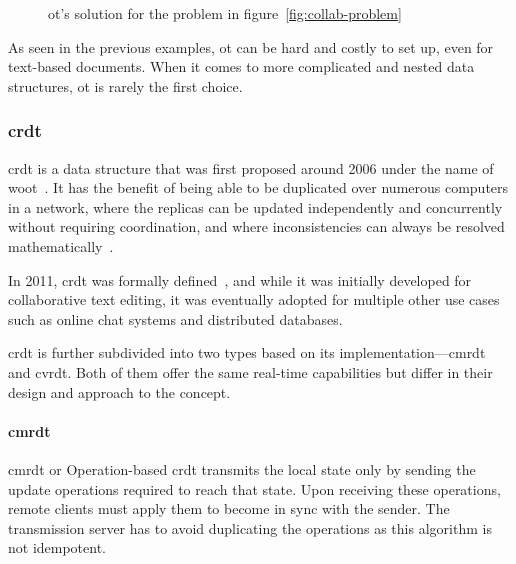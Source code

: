 \begin{toexclude}
\begin{figure}[H]

	\caption{\acrshort{ot}'s solution for the problem in figure~\ref{fig:collab-problem}}
	\label{fig:collab-sol-ot}
\end{figure}

As seen in the previous examples, \acrshort{ot} can be hard and costly to set up, even for text-based documents.
When it comes to more complicated and nested data structures, \acrshort{ot} is rarely the first choice.

\subsubsection{\acrshort{crdt}}

\acrlong{crdt} is a data structure that was first proposed around 2006 under the name of \acrfull{woot}~\autocite{sun_real_2020}.
It has the benefit of being able to be duplicated over numerous computers in a network, where the replicas can be updated independently and concurrently without requiring coordination, and where inconsistencies can always be resolved mathematically~\autocite{shapiro_conflict-free_2011}.

In 2011, \acrshort{crdt} was formally defined~\autocite{shapiro_conflict-free_2011}, and while it was initially developed for collaborative text editing, it was eventually adopted for multiple other use cases such as online chat systems and distributed databases.

\acrshort{crdt} is further subdivided into two types based on its implementation---\acrfull{cmrdt} and \acrfull{cvrdt}. Both of them offer the same real-time capabilities but differ in their design and approach to the concept.

\paragraph{\acrshort{cmrdt}}

\acrlong{cmrdt} or Operation-based \acrshort{crdt} transmits the local state only by sending the update operations required to reach that state.
Upon receiving these operations, remote clients must apply them to become in sync with the sender. The transmission server has to avoid duplicating the operations as this algorithm is not idempotent.


\end{toexclude}
